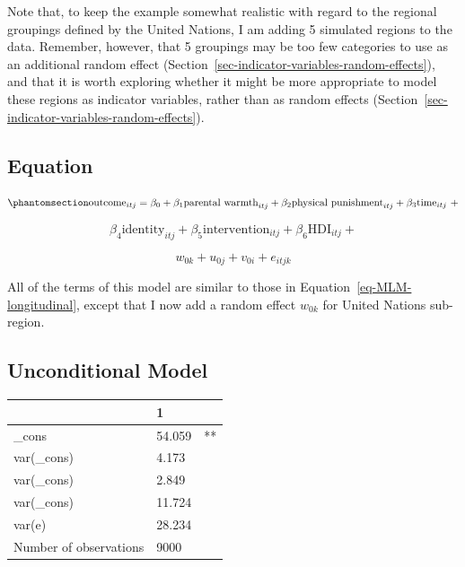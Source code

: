 \documentclass[
  letterpaper,
  DIV=11,
  numbers=noendperiod]{scrreprt}
\begin{document}
\begin{tcolorbox}[enhanced jigsaw, coltitle=black, titlerule=0mm, colframe=quarto-callout-caution-color-frame, opacitybacktitle=0.6, toprule=.15mm, colback=white, bottomrule=.15mm, opacityback=0, breakable, title=\textcolor{quarto-callout-caution-color}{\faFire}\hspace{0.5em}{Caution}, bottomtitle=1mm, toptitle=1mm, arc=.35mm, leftrule=.75mm, colbacktitle=quarto-callout-caution-color!10!white, rightrule=.15mm, left=2mm]

Note that, to keep the example somewhat realistic with regard to the
regional groupings defined by the United Nations, I am adding 5
simulated regions to the data. Remember, however, that 5 groupings may
be too few categories to use as an additional random effect
(Section~\ref{sec-indicator-variables-random-effects}), and that it is
worth exploring whether it might be more appropriate to model these
regions as indicator variables, rather than as random effects
(Section~\ref{sec-indicator-variables-random-effects}).

\end{tcolorbox}

\subsection{Equation}\label{equation}

\begin{equation}\phantomsection\label{eq-MLM-fourlevel}{\text{outcome}_{itj} = \beta_0 + \beta_1 \text{parental warmth}_{itj} + \beta_2 \text{physical punishment}_{itj} + \beta_3 \text{time}_{itj} \ + }\end{equation}

\[\beta_4 \text{identity}_{itj} + \beta_5 \text{intervention}_{itj} + \beta_6 \text{HDI}_{itj} +\]

\[w_{0k} + u_{0j} + v_{0i} + e_{itjk}\]

All of the terms of this model are similar to those in
Equation~\ref{eq-MLM-longitudinal}, except that I now add a random
effect \(w_{0k}\) for United Nations sub-region.

\subsection{Unconditional Model}\label{unconditional-model-1}

\begin{longtable}[]{@{}lll@{}}
\toprule\noalign{}
& 1 & \\
\midrule\noalign{}
\endhead
\bottomrule\noalign{}
\endlastfoot
\_cons & 54.059 & ** \\
var(\_cons) & 4.173 & \\
var(\_cons) & 2.849 & \\
var(\_cons) & 11.724 & \\
var(e) & 28.234 & \\
Number of observations & 9000 & \\
\end{longtable}
\end{document}
